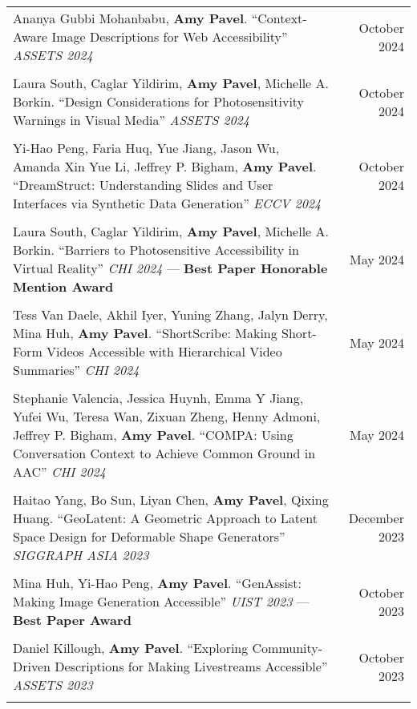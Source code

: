 \begin{longtable}{Xr}
	Ananya Gubbi Mohanbabu, \textbf{Amy Pavel}. ``Context-Aware Image Descriptions for Web Accessibility'' \textit{ASSETS 2024} & October 2024 \\
	\\

	Laura South, Caglar Yildirim, \textbf{Amy Pavel}, Michelle A. Borkin. ``Design Considerations for Photosensitivity Warnings in Visual Media'' \textit{ASSETS 2024} & October 2024 \\
	\\

	Yi-Hao Peng, Faria Huq, Yue Jiang, Jason Wu, Amanda Xin Yue Li, Jeffrey P. Bigham, \textbf{Amy Pavel}. ``DreamStruct: Understanding Slides and User Interfaces via Synthetic Data Generation'' \textit{ECCV 2024} & October 2024 \\
	\\

	Laura South, Caglar Yildirim, \textbf{Amy Pavel}, Michelle A. Borkin. ``Barriers to Photosensitive Accessibility in Virtual Reality'' \textit{CHI 2024} --- \textbf{Best Paper Honorable Mention Award} & May 2024 \\
	\\

	Tess Van Daele, Akhil Iyer, Yuning Zhang, Jalyn Derry, Mina Huh, \textbf{Amy Pavel}. ``ShortScribe: Making Short-Form Videos Accessible with Hierarchical Video Summaries'' \textit{CHI 2024} & May 2024 \\
	\\

	Stephanie Valencia, Jessica Huynh, Emma Y Jiang, Yufei Wu, Teresa Wan, Zixuan Zheng, Henny Admoni, Jeffrey P. Bigham, \textbf{Amy Pavel}. ``COMPA: Using Conversation Context to Achieve Common Ground in AAC'' \textit{CHI 2024} & May 2024 \\
	\\

	Haitao Yang, Bo Sun, Liyan Chen, \textbf{Amy Pavel}, Qixing Huang. ``GeoLatent: A Geometric Approach to Latent Space Design for Deformable Shape Generators'' \textit{SIGGRAPH ASIA 2023} & December 2023 \\
	\\

	Mina Huh, Yi-Hao Peng, \textbf{Amy Pavel}. ``GenAssist: Making Image Generation Accessible'' \textit{UIST 2023} --- \textbf{Best Paper Award} & October 2023 \\
	\\

	Daniel Killough, \textbf{Amy Pavel}. ``Exploring Community-Driven Descriptions for Making Livestreams Accessible'' \textit{ASSETS 2023} & October 2023 \\
	\\


\end{longtable}
